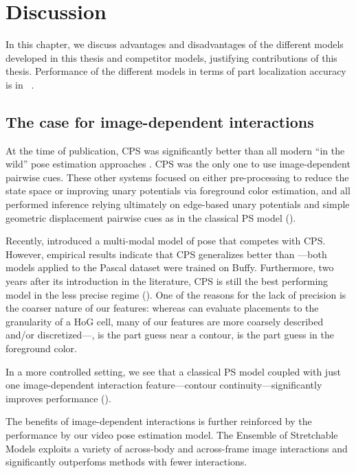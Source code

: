 \chapter{Discussion}\label{sec:discussion}

In this chapter, we discuss advantages and disadvantages of the different 
models developed in this thesis and competitor models, justifying contributions 
of this thesis.  Performance of the different models in terms of part 
localization accuracy is in ~.

\section{The case for image-dependent interactions}

At the time of publication, CPS was significantly better than all modern ``in 
the wild'' pose estimation approaches 
\citep{ferrari08,eichner09,devacrf,andriluka09}.  CPS was the only one to use 
image-dependent pairwise cues.  These other systems focused on either 
pre-processing to reduce the state space or improving unary potentials via 
foreground color estimation, and all performed inference relying ultimately on 
edge-based unary potentials and simple geometric displacement pairwise cues as 
in the classical PS model ().


Recently, \citet{deva2011} introduced a multi-modal model of pose that competes 
with CPS. However, empirical results indicate that CPS generalizes better than 
\citet{deva2011}---both models applied to the Pascal dataset were trained on 
Buffy.  Furthermore, two years after its introduction in the literature, CPS is 
still the best performing model in the less precise regime 
().  One of the reasons for the lack of precision 
is the coarser nature of our features: whereas \citet{deva2011} can evaluate 
placements to the granularity of a HoG cell, many of our features are more 
coarsely described and/or discretized---\eg, is the part guess near a contour, 
is the part guess in the foreground color.

In a more controlled setting, we see that a classical PS model coupled with 
just one image-dependent interaction feature---contour 
continuity---significantly improves performance ().

The benefits of image-dependent interactions is further reinforced by the 
performance by our video pose estimation model.  The Ensemble of Stretchable 
Models exploits a variety of across-body and across-frame image interactions 
and significantly outperfoms methods with fewer interactions.

